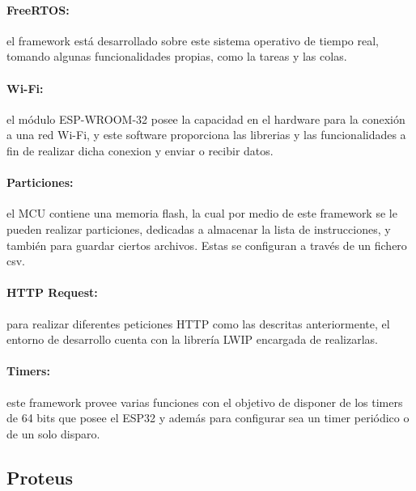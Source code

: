 \paragraph{FreeRTOS:}el framework está desarrollado sobre este sistema operativo de tiempo real, tomando algunas funcionalidades propias, como la tareas y las colas.

\paragraph{Wi-Fi:}el módulo ESP-WROOM-32 posee la capacidad en el hardware para la conexión a una red Wi-Fi, y este software proporciona las librerias y las funcionalidades a fin de realizar dicha conexion y enviar o recibir datos.

\paragraph{Particiones:}el MCU contiene una memoria flash, la cual por medio de este framework se le pueden realizar particiones, dedicadas a almacenar la lista de instrucciones, y también para guardar ciertos archivos. Estas se configuran a través de un fichero csv.


\paragraph{HTTP Request:}para realizar diferentes peticiones HTTP como las descritas anteriormente, el entorno de desarrollo cuenta con la librería LWIP encargada de realizarlas.

\paragraph{Timers:}este framework provee varias funciones con el objetivo de disponer de los timers de 64 bits que posee el ESP32 y además para configurar sea un timer periódico o de un solo disparo.

\subsection{Proteus}

